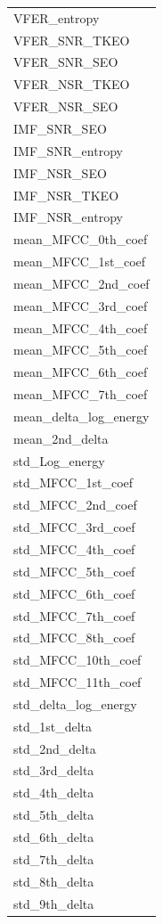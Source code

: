 \documentclass[
]{article}
\begin{document}
\begin{table}
\begin{tabular}{l}
VFER\_entropy\\
VFER\_SNR\_TKEO\\
VFER\_SNR\_SEO\\
\addlinespace
VFER\_NSR\_TKEO\\
VFER\_NSR\_SEO\\
IMF\_SNR\_SEO\\
IMF\_SNR\_entropy\\
IMF\_NSR\_SEO\\
\addlinespace
IMF\_NSR\_TKEO\\
IMF\_NSR\_entropy\\
mean\_MFCC\_0th\_coef\\
mean\_MFCC\_1st\_coef\\
mean\_MFCC\_2nd\_coef\\
\addlinespace
mean\_MFCC\_3rd\_coef\\
mean\_MFCC\_4th\_coef\\
mean\_MFCC\_5th\_coef\\
mean\_MFCC\_6th\_coef\\
mean\_MFCC\_7th\_coef\\
\addlinespace
mean\_delta\_log\_energy\\
mean\_2nd\_delta\\
std\_Log\_energy\\
std\_MFCC\_1st\_coef\\
std\_MFCC\_2nd\_coef\\
\addlinespace
std\_MFCC\_3rd\_coef\\
std\_MFCC\_4th\_coef\\
std\_MFCC\_5th\_coef\\
std\_MFCC\_6th\_coef\\
std\_MFCC\_7th\_coef\\
\addlinespace
std\_MFCC\_8th\_coef\\
std\_MFCC\_10th\_coef\\
std\_MFCC\_11th\_coef\\
std\_delta\_log\_energy\\
std\_1st\_delta\\
\addlinespace
std\_2nd\_delta\\
std\_3rd\_delta\\
std\_4th\_delta\\
std\_5th\_delta\\
std\_6th\_delta\\
\addlinespace
std\_7th\_delta\\
std\_8th\_delta\\
std\_9th\_delta\\

\end{tabular}
\end{table}
\end{document}
